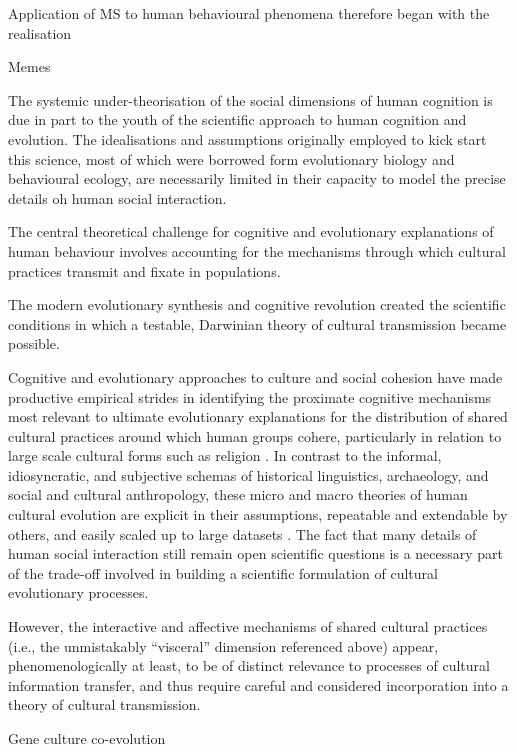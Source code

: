 Application of MS to human behavioural phenomena therefore began with the realisation

Memes

The systemic under-theorisation of the social dimensions of human cognition is due in part to the youth of the scientific approach to human cognition and evolution. The idealisations and assumptions originally employed to kick start this science, most of which were borrowed form evolutionary biology and behavioural ecology, are necessarily limited in their capacity to model the precise details oh human social interaction.

The central theoretical challenge for cognitive and evolutionary explanations of human behaviour involves accounting for the mechanisms through which cultural practices transmit and fixate in populations.

The modern evolutionary synthesis and cognitive revolution created the scientific conditions in which a testable, Darwinian theory of cultural transmission became possible.



Cognitive and evolutionary approaches to culture and social cohesion have made productive empirical strides in identifying the proximate cognitive mechanisms most relevant to ultimate evolutionary explanations for the distribution of shared cultural practices around which human groups cohere, particularly in relation to large scale cultural forms such as religion \citep{Henrich2015,Purzycki2016b}.  In contrast to the informal, idiosyncratic, and subjective schemas of historical linguistics, archaeology, and social and cultural anthropology, these micro and macro theories of human cultural evolution are explicit in their assumptions, repeatable and extendable by others, and easily scaled up to large datasets \citep{Mesoudi2017}. The fact that many details of human social interaction still remain open scientific questions is a necessary part of the trade-off involved in building a scientific formulation of cultural evolutionary processes.


However, the interactive and affective mechanisms of shared cultural practices (i.e., the unmistakably ``visceral'' dimension referenced above) appear, phenomenologically at least, to be of distinct relevance to processes of cultural information transfer, and thus require careful and considered incorporation into a theory of cultural transmission.




Gene culture co-evolution

